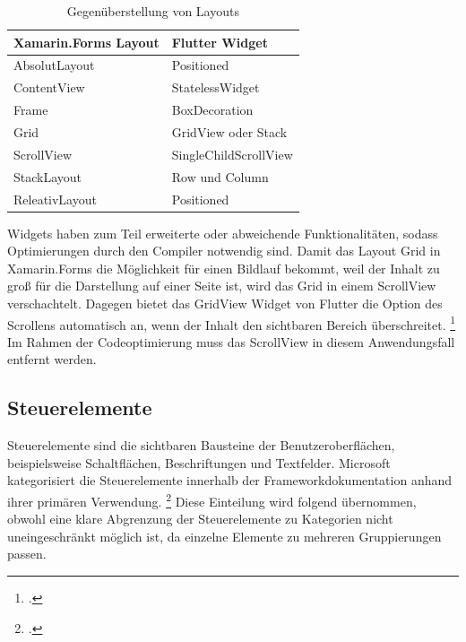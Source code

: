 \begin{table}[!ht]
\begin{tabularx}{\textwidth}{|X|X|}
\hline
   \textbf{Xamarin.Forms Layout} & \textbf{Flutter Widget}  \\
\hline
	AbsolutLayout       		&  Positioned	 			\\ 
	ContentView       		&  StatelessWidget	 			\\ 
	Frame       					&  BoxDecoration     	 			\\ 
	Grid            				&  GridView oder Stack		\\ 
	ScrollView            		&  SingleChildScrollView		\\ 
	StackLayout       		&  Row und Column  	 			\\ 
	ReleativLayout           &  Positioned		\\ 
	\hline

\end{tabularx}
\caption{Gegenüberstellung von Layouts}
 \label{tab:XamLayouts}
\end{table}

Widgets haben zum Teil erweiterte oder abweichende Funktionalitäten, sodass Optimierungen durch den Compiler notwendig sind.  Damit das Layout \glq Grid\grq{} in Xamarin.Forms die Möglichkeit für einen Bildlauf bekommt, weil der Inhalt zu groß für die Darstellung auf einer Seite ist, wird das \glq Grid\grq{} in einem \glq ScrollView\grq{} verschachtelt. Dagegen bietet das \glq GridView\grq{} Widget von Flutter die Option des Scrollens automatisch an, wenn der Inhalt den sichtbaren Bereich überschreitet. \footcite[Vgl.][Abgerufen am \today]{GoogleFlutterGridView2020} Im Rahmen der Codeoptimierung muss das \glq ScrollView\grq{} in diesem Anwendungsfall entfernt werden.

\subsection{Steuerelemente}

Steuerelemente sind die sichtbaren Bausteine der Benutzeroberflächen,  beispielsweise Schaltflächen, Beschriftungen und Textfelder.  
Microsoft kategorisiert die Steuerelemente innerhalb der Frameworkdokumentation anhand ihrer primären Verwendung. \footcite[Vgl.][Abgerufen am \today]{MicrosoftXamViews2020} Diese Einteilung wird folgend übernommen,  obwohl eine klare Abgrenzung der  Steuerelemente zu Kategorien nicht uneingeschränkt möglich ist,  da einzelne Elemente zu mehreren Gruppierungen passen.


